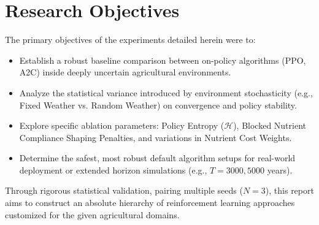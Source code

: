 \section{Research Objectives}

The primary objectives of the experiments detailed herein were to:
\begin{itemize}
    \item Establish a robust baseline comparison between on-policy algorithms (PPO, A2C) inside deeply uncertain agricultural environments.
    \item Analyze the statistical variance introduced by environment stochasticity (e.g., Fixed Weather vs. Random Weather) on convergence and policy stability.
    \item Explore specific ablation parameters: Policy Entropy ($\mathcal{H}$), Blocked Nutrient Compliance Shaping Penalties, and variations in Nutrient Cost Weights.
    \item Determine the safest, most robust default algorithm setups for real-world deployment or extended horizon simulations (e.g., $T=3000, 5000$ years).
\end{itemize}

Through rigorous statistical validation, pairing multiple seeds ($N=3$), this report aims to construct an absolute hierarchy of reinforcement learning approaches customized for the given agricultural domains.
